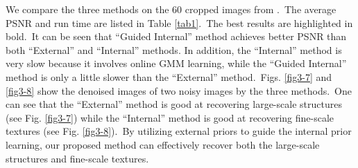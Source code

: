 We compare the three methods on the 60 cropped images from \cite{crosschannel2016}.\ The average PSNR and run time are listed in Table \ref{tab1}.\ The best results are highlighted in bold.\ It can be seen that ``Guided Internal'' method achieves better PSNR than both ``External'' and ``Internal'' methods. In addition, the ``Internal'' method is very slow because it involves online GMM learning, while the ``Guided Internal'' method is only a little slower than the ``External'' method.\ Figs. \ref{fig3-7} and \ref{fig3-8} show the denoised images of two noisy images by the three methods.\ One can see that the  ``External'' method is good at recovering large-scale structures (see Fig. \ref{fig3-7}) while the ``Internal'' method is good at recovering fine-scale textures (see Fig. \ref{fig3-8}).\ By utilizing external priors to guide the internal prior learning, our proposed method can effectively recover both the large-scale structures and fine-scale textures. 

